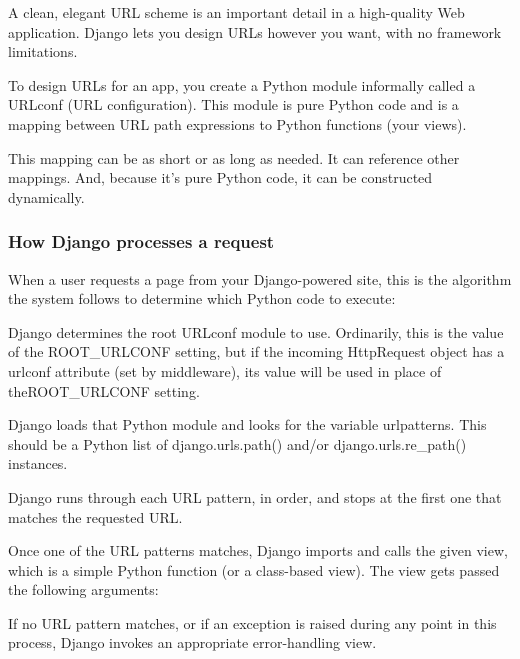 \documentclass[10pt]{article}
\begin{document}
A clean, elegant URL scheme is an important detail in a high-quality Web application. Django lets you design URLs however you want, with no framework limitations.

To design URLs for an app, you create a Python module informally called a URLconf (URL configuration). This module is pure Python code and is a mapping between URL path expressions to Python functions (your views).

This mapping can be as short or as long as needed. It can reference other mappings. And, because it’s pure Python code, it can be constructed dynamically.

\subsubsection{How Django processes a request}

When a user requests a page from your Django-powered site, this is the algorithm the system follows to determine which Python code to execute:

\begin{description}[font=$\bullet$~\normalfont\scshape\color{red!50!black}]

\item [] Django determines the root URLconf module to use. Ordinarily, this is the value of the ROOT\_URLCONF setting, but if the incoming HttpRequest object has a urlconf attribute (set by middleware), its value will be used in place of theROOT\_URLCONF setting.

\item [] Django loads that Python module and looks for the variable urlpatterns. This should be a Python list of django.urls.path() and/or django.urls.re\_path() instances.

\item [] Django runs through each URL pattern, in order, and stops at the first one that matches the requested URL.

\item [] Once one of the URL patterns matches, Django imports and calls the given view, which is a simple Python function (or a class-based view). The view gets passed the following arguments:

 
 

\item [] If no URL pattern matches, or if an exception is raised during any point in this process, Django invokes an appropriate error-handling view.
\end{description}
\end{document}
